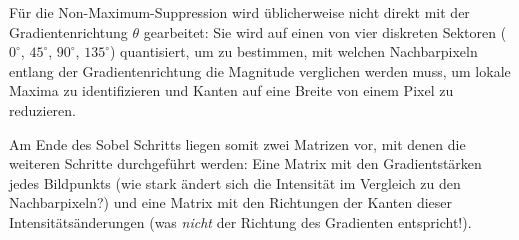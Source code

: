 Für die Non-Maximum-Suppression wird üblicherweise nicht direkt mit der
Gradientenrichtung $\theta$ gearbeitet: Sie wird auf einen von vier diskreten
Sektoren ($0^\circ$, $45^\circ$, $90^\circ$, $135^\circ$) quantisiert, um zu
bestimmen, mit welchen Nachbarpixeln entlang der Gradientenrichtung die
Magnitude verglichen werden muss, um lokale Maxima zu identifizieren und
Kanten auf eine Breite von einem Pixel zu reduzieren.

Am Ende des Sobel Schritts liegen somit zwei Matrizen vor, mit denen die weiteren Schritte durchgeführt werden: Eine Matrix mit den Gradientstärken jedes Bildpunkts (wie stark ändert sich die Intensität im Vergleich zu den Nachbarpixeln?) und eine Matrix mit den Richtungen der Kanten dieser Intensitätsänderungen (was \textit{nicht} der Richtung des Gradienten entspricht!).
